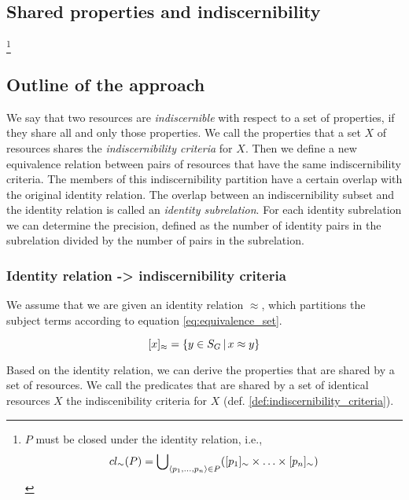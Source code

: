 \subsection{Shared properties and indiscernibility}
\label{sec:indiscernibility}

\footnote{
  $P$ must be closed under the identity relation, i.e.,
  \begin{equation*}
    cl_{\sim}(P) = \bigcup_{\langle p_1,\ldots,p_n\rangle \in P}\nolimits (
      [p_1]_{\sim} \times \ldots \times [p_n]_{\sim}
    )
  \end{equation*}
}

\subsection{Outline of the approach}

We say that two resources are \emph{indiscernible}
  with respect to a set of properties,
  if they share all and only those properties.
We call the properties that a set $X$ of resources shares
  the \emph{indiscernibility criteria} for $X$.
Then we define a new equivalence relation between pairs of resources
  that have the same indiscernibility criteria.
The members of this indiscernibility partition
  have a certain overlap with the original identity relation.
The overlap between an indiscernibility subset and the identity relation
  is called an \emph{identity subrelation}.
For each identity subrelation we can determine the precision,
  defined as the number of identity pairs in the subrelation
  divided by the number of pairs in the subrelation.

\subsubsection{Identity relation -> indiscernibility criteria}

We assume that we are given an identity relation $\approx$,
  which partitions the subject terms according to
  equation \ref{eq:equivalence_set}.

\small
\begin{equation}
\label{eq:equivalence_set}
  [x]_{\approx}
=
  \{
    y \in S_G
  \,\vert\,
    x \approx y
  \}
\end{equation}
\normalsize

Based on the identity relation, we can derive the properties
  that are shared by a set of resources.
We call the predicates that are shared by a set of identical resources $X$
  the indiscenibility criteria for $X$
  (def. \ref{def:indiscernibility_criteria}).

